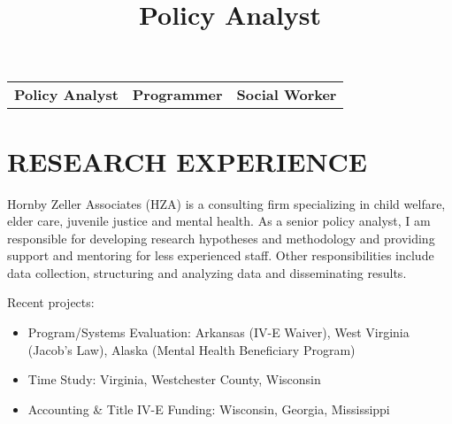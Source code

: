 \documentclass[line, margin, 10pt]{res}
\begin{document}
 

\address{156 Willow Street Guilderland, NY 12084}
\address{andy.choens@gmail.com  (518) 275-5984}

\begin{resume}

  \vspace{.01in}
  \begin{tabular} {c|c|c}
    {\bf Policy Analyst} & {\bf Programmer} & {\bf Social Worker}
  \end{tabular}
  \vspace{.01in}

  \section{RESEARCH EXPERIENCE}


  \title{Policy Analyst}
  \begin{position}
    Hornby Zeller Associates (HZA) is a consulting firm specializing
    in child welfare, elder care, juvenile justice and mental
    health. As a senior policy analyst, I am responsible for
    developing research hypotheses and methodology and providing
    support and mentoring for less experienced staff. Other
    responsibilities include data collection, structuring and
    analyzing data and disseminating results.

    Recent projects:
    \begin{itemize}
    \item Program/Systems Evaluation: Arkansas (IV-E Waiver), West
      Virginia (Jacob's Law), Alaska (Mental Health Beneficiary Program)
    \item Time Study: Virginia, Westchester County, Wisconsin
    \item Accounting \& Title IV-E Funding: Wisconsin, Georgia, Mississippi
    \end{itemize}


\end{position}
\end{resume}
\end{document}
